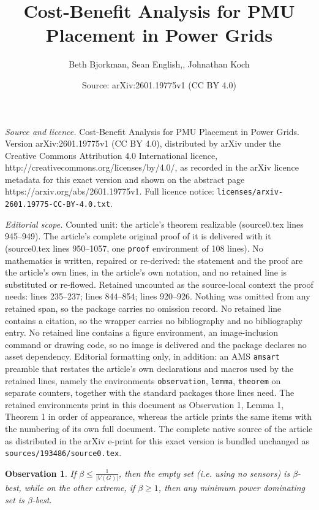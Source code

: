 \documentclass[10pt,a4paper]{amsart}
\title{Cost-Benefit Analysis for PMU Placement in Power Grids}
\author{Beth Bjorkman, Sean English,, Johnathan Koch}
\date{Source: arXiv:2601.19775v1 (CC BY 4.0)}
\newtheorem{observation}{Observation}
\begin{document}
\maketitle

\noindent\emph{Source and licence.} Cost-Benefit Analysis for PMU Placement in Power Grids. Version arXiv:2601.19775v1 (CC BY 4.0), distributed by arXiv under the Creative Commons Attribution 4.0 International licence, http://creativecommons.org/licenses/by/4.0/, as recorded in the arXiv licence metadata for this exact version and shown on the abstract page https://arxiv.org/abs/2601.19775v1. Full licence notice: \texttt{licenses/arxiv-2601.19775-CC-BY-4.0.txt}.\par\smallskip

\noindent\textit{Editorial scope.} Counted unit: the article's theorem realizable (source0.tex lines 945--949). The article's complete original proof of it is delivered with it (source0.tex lines 950--1057, one \texttt{proof} environment of 108 lines). No mathematics is written, repaired or re-derived: the statement and the proof are the article's own lines, in the article's own notation, and no retained line is substituted or re-flowed.  Retained uncounted as the source-local context the proof needs: lines 235--237; lines 844--854; lines 920--926.  Nothing was omitted from any retained span, so the package carries no omission record.  No retained line contains a citation, so the wrapper carries no bibliography and no bibliography entry.  No retained line contains a figure environment, an image-inclusion command or drawing code, so no image is delivered and the package declares no asset dependency.  Editorial formatting only, in addition: an AMS \texttt{amsart} preamble that restates the article's own declarations and macros used by the retained lines, namely the environments \texttt{observation}, \texttt{lemma}, \texttt{theorem} on separate counters, together with the standard packages those lines need.  The retained environments print in this document as Observation 1, Lemma 1, Theorem 1 in order of appearance, whereas the article prints the same items with the numbering of its own full document.  The complete native source of the article as distributed in the arXiv e-print for this exact version is bundled unchanged as \texttt{sources/193486/source0.tex}.
        \begin{observation}\label{observation beta small or large}
        	If $\beta\leq \frac{1}{|V(G)|}$, then the empty set (i.e. using no sensors) is $\beta$-best, while on the other extreme, if $\beta\geq 1$, then any minimum power dominating set is $\beta$-best.
        \end{observation}
\end{document}
